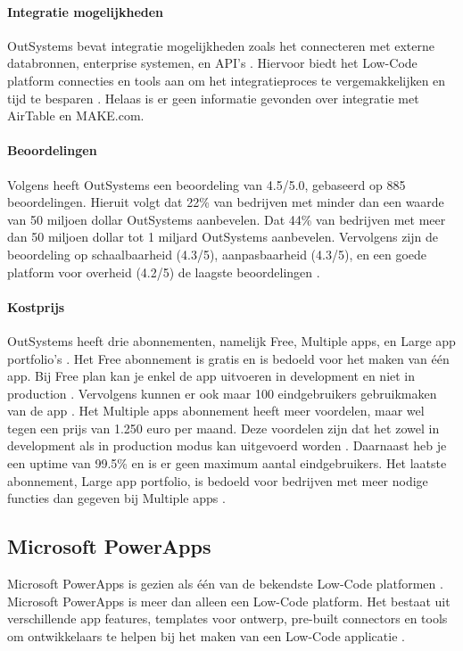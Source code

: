 \paragraph{Integratie mogelijkheden}
OutSystems bevat integratie mogelijkheden zoals het connecteren met externe databronnen, enterprise systemen, en API's \autocite{Payne2023}.
Hiervoor biedt het Low-Code platform connecties en tools aan om het integratieproces te vergemakkelijken en tijd te besparen \autocite{Payne2023}. Helaas
is er geen informatie gevonden over integratie met AirTable en MAKE.com.

\paragraph{Beoordelingen}
Volgens \textcite{Gartner2024} heeft OutSystems een beoordeling van 4.5/5.0, gebaseerd op 885 beoordelingen. 
Hieruit volgt dat 22\% van bedrijven met minder dan een waarde van 50 miljoen dollar OutSystems aanbevelen. Dat 44\% van bedrijven met meer dan 50 miljoen dollar tot 1 miljard OutSystems aanbevelen.
Vervolgens zijn de beoordeling op schaalbaarheid (4.3/5), aanpasbaarheid (4.3/5), en een goede platform voor overheid (4.2/5) de laagste beoordelingen \autocite{Gartner2024}.

\paragraph{Kostprijs}
OutSystems heeft drie abonnementen, namelijk Free, Multiple apps, en Large app portfolio's \autocite{OutSystems}. Het Free abonnement is gratis en is bedoeld voor het maken van één app.
Bij Free plan kan je enkel de app uitvoeren in development en niet in production \autocite{OutSystems}. Vervolgens kunnen er ook maar 100 eindgebruikers gebruikmaken van de app \autocite{OutSystems}.
Het Multiple apps abonnement heeft meer voordelen, maar wel tegen een prijs van 1.250 euro per maand. Deze voordelen zijn dat het zowel in development als in production modus kan uitgevoerd worden \autocite{OutSystems}.
Daarnaast heb je een uptime van 99.5\% en is er geen maximum aantal eindgebruikers. Het laatste abonnement, Large app portfolio, is bedoeld voor bedrijven met meer nodige functies dan gegeven bij Multiple apps \autocite{OutSystems}. 
\subsection{Microsoft PowerApps}%
\label{subsec:microsoft-powerapps}
Microsoft PowerApps is gezien als één van de bekendste Low-Code platformen \autocite{Nguyen} \autocite{Gupta2023}.
Microsoft PowerApps is meer dan alleen een Low-Code platform. Het bestaat uit verschillende app features, templates voor ontwerp, pre-built connectors en tools om ontwikkelaars te helpen bij het maken van een Low-Code applicatie \autocite{Nguyen}.

